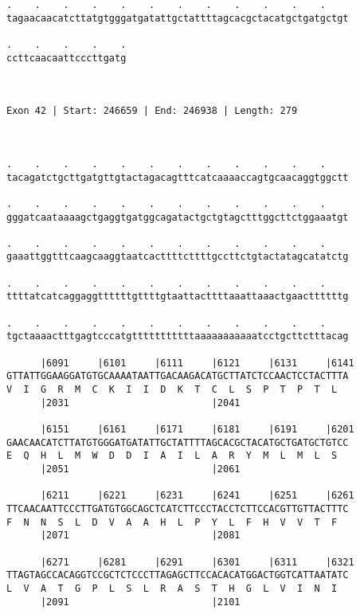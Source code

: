 \documentclass{article}
\begin{document}
\begin{Verbatim}
.    .    .    .    .    .    .    .    .    .    .    .    
tagaacaacatcttatgtgggatgatattgctattttagcacgctacatgctgatgctgt
                                                            
.    .    .    .    .
ccttcaacaattcccttgatg
                     
                     
 
Exon 42 | Start: 246659 | End: 246938 | Length: 279



.    .    .    .    .    .    .    .    .    .    .    .    
tacagatctgcttgatgttgtactagacagtttcatcaaaaccagtgcaacaggtggctt
                                                            
.    .    .    .    .    .    .    .    .    .    .    .    
gggatcaataaaagctgaggtgatggcagatactgctgtagctttggcttctggaaatgt
                                                            
.    .    .    .    .    .    .    .    .    .    .    .    
gaaattggtttcaagcaaggtaatcacttttcttttgccttctgtactatagcatatctg
                                                            
.    .    .    .    .    .    .    .    .    .    .    .    
ttttatcatcaggaggttttttgttttgtaattacttttaaattaaactgaacttttttg
                                                            
.    .    .    .    .    .    .    .    .    .    .    .    
tgctaaaactttgagtcccatgtttttttttttaaaaaaaaaaatcctgcttctttacag
                                                            
      |6091     |6101     |6111     |6121     |6131     |6141
GTTATTGGAAGGATGTGCAAAATAATTGACAAGACATGCTTATCTCCAACTCCTACTTTA
V  I  G  R  M  C  K  I  I  D  K  T  C  L  S  P  T  P  T  L  
      |2031                         |2041                   
  
      |6151     |6161     |6171     |6181     |6191     |6201
GAACAACATCTTATGTGGGATGATATTGCTATTTTAGCACGCTACATGCTGATGCTGTCC
E  Q  H  L  M  W  D  D  I  A  I  L  A  R  Y  M  L  M  L  S  
      |2051                         |2061                   
  
      |6211     |6221     |6231     |6241     |6251     |6261
TTCAACAATTCCCTTGATGTGGCAGCTCATCTTCCCTACCTCTTCCACGTTGTTACTTTC
F  N  N  S  L  D  V  A  A  H  L  P  Y  L  F  H  V  V  T  F  
      |2071                         |2081                   
  
      |6271     |6281     |6291     |6301     |6311     |6321
TTAGTAGCCACAGGTCCGCTCTCCCTTAGAGCTTCCACACATGGACTGGTCATTAATATC
L  V  A  T  G  P  L  S  L  R  A  S  T  H  G  L  V  I  N  I  
      |2091                         |2101                   
  

\end{Verbatim}
\end{document}

